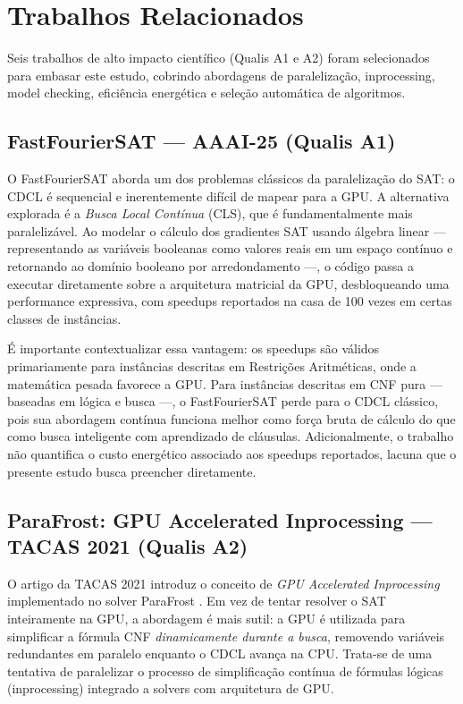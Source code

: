 \documentclass[12pt]{article}
\begin{document}
\section{Trabalhos Relacionados}


Seis trabalhos de alto impacto científico (Qualis A1 e A2) foram selecionados para embasar este estudo, cobrindo abordagens de paralelização, inprocessing, model checking, eficiência energética e seleção automática de algoritmos.

\subsection{FastFourierSAT — AAAI-25 (Qualis A1)}

O FastFourierSAT \cite{fastfouriersat:2025} aborda um dos problemas clássicos da paralelização do SAT: o CDCL é sequencial e inerentemente difícil de mapear para a GPU. A alternativa explorada é a \textit{Busca Local Contínua} (CLS), que é fundamentalmente mais paralelizável. Ao modelar o cálculo dos gradientes SAT usando álgebra linear — representando as variáveis booleanas como valores reais em um espaço contínuo e retornando ao domínio booleano por arredondamento —, o código passa a executar diretamente sobre a arquitetura matricial da GPU, desbloqueando uma performance expressiva, com speedups reportados na casa de 100 vezes em certas classes de instâncias.

É importante contextualizar essa vantagem: os speedups são válidos primariamente para instâncias descritas em Restrições Aritméticas, onde a matemática pesada favorece a GPU. Para instâncias descritas em CNF pura — baseadas em lógica e busca —, o FastFourierSAT perde para o CDCL clássico, pois sua abordagem contínua funciona melhor como força bruta de cálculo do que como busca inteligente com aprendizado de cláusulas. Adicionalmente, o trabalho não quantifica o custo energético associado aos speedups reportados, lacuna que o presente estudo busca preencher diretamente.

\subsection{ParaFrost: GPU Accelerated Inprocessing — TACAS 2021 (Qualis A2)}

O artigo da TACAS 2021 introduz o conceito de \textit{GPU Accelerated Inprocessing} implementado no solver ParaFrost \cite{parafrost:tacas:2021}. Em vez de tentar resolver o SAT inteiramente na GPU, a abordagem é mais sutil: a GPU é utilizada para simplificar a fórmula CNF \textit{dinamicamente durante a busca}, removendo variáveis redundantes em paralelo enquanto o CDCL avança na CPU. Trata-se de uma tentativa de paralelizar o processo de simplificação contínua de fórmulas lógicas (inprocessing) integrado a solvers com arquitetura de GPU.
\end{document}
